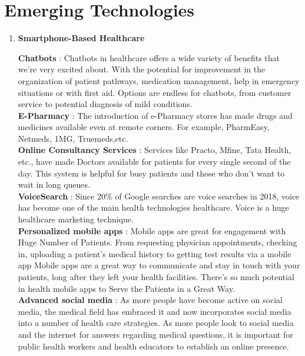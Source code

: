 \documentclass[12pt]{article}
\begin{document}
\section{Emerging Technologies}
\begin{enumerate}

\item \textbf{Smartphone-Based Healthcare}
\begin{enumerate}

 \textbf{ Chatbots }: Chatbots in healthcare offers a wide variety of benefits that we're very excited about. With the potential for improvement in the organization of patient pathways, medication management, help in emergency situations or with first aid. Options are endless for chatbots, from customer service to potential diagnosis of mild conditions.\\
 \textbf{ E-Pharmacy }: The introduction of e-Pharmacy stores has made drugs and medicines available even at remote corners. For example, PharmEasy, Netmeds, 1MG, Truemeds,etc.\\
 \textbf{ Online Consultancy Services }: Services like Practo, Mfine, Tata Health, etc., have made Doctors available for patients for every single second of the day. This system is helpful for busy patients and those who don't want to wait in long queues.\\
 \textbf{ VoiceSearch } : Since 20\% of Google searches are voice searches in 2018, voice has become one of the main health technologies healthcare. Voice is a huge healthcare marketing technique.\\
 \textbf{ Personalized mobile apps }: Mobile apps are great for engagement with Huge Number of Patients. From requesting physician appointments, checking in, uploading a patient's medical history to getting test results via a mobile app Mobile apps are a great way to communicate and stay in touch with your patients, long after they left your health facilities. There's so much potential in health mobile apps to Serve the Patients in a Great Way.\\
 \textbf{ Advanced social media } : As more people have become active on social media, the medical field has embraced it and now incorporates social media into a number of health care strategies. As more people look to social media and the internet for answers regarding medical questions, it is important for public health workers and health educators to establish an online presence.
 

\end{enumerate}
\end{enumerate}
\end{document}
